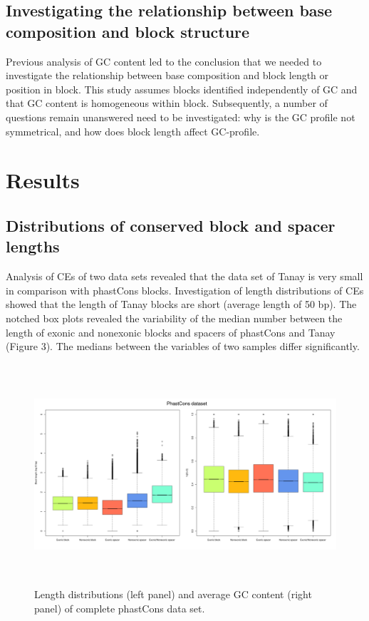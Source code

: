 \documentclass[12pt]{report}
\begin{document}
\subsection{Investigating the relationship between base composition and block structure}
Previous analysis of GC content led to the conclusion that we needed to investigate the relationship between base composition and block length or position in block. This study assumes blocks identified independently of GC and that GC content is homogeneous within block. Subsequently, a number of questions remain unanswered need to be investigated: why is the GC profile not symmetrical, and how does block length affect GC-profile.

\newpage
\section{Results}
\subsection{Distributions of conserved block and spacer lengths}
Analysis of CEs of two data sets revealed that the data set of Tanay is very small in comparison with phastCons blocks. Investigation of length distributions of CEs showed that the length of Tanay blocks are short (average length of 50 bp). The notched box plots revealed the variability of the median number between the length of exonic and nonexonic blocks and spacers of phastCons and Tanay (Figure 3). The medians between the variables of two samples differ significantly.\\

\begin{figure}[htbp]
\centering
\includegraphics[width=\textwidth, height=82mm]{whole_phastcons_lenghts_GC}
\caption{Length distributions (left panel) and average GC content (right panel) of complete phastCons data set.}
\label{fig:blocks_spacers_distributions_phast}
\end{figure}
\end{document}
